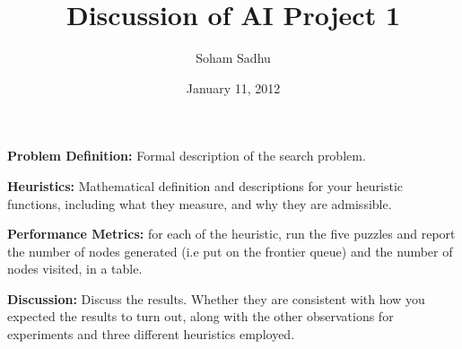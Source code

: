 \documentclass[12pt]{article}
\begin{document}
\title{ Discussion of AI Project 1 }
\author{ Soham Sadhu }
\date{ January 11, 2012 }
\maketitle

{\bf Problem Definition:} Formal description of the search problem.

{\bf Heuristics:} Mathematical definition and descriptions for your heuristic functions, including what they measure, and why they are admissible.

{\bf Performance Metrics:} for each of the heuristic, run the five puzzles and report the number of nodes generated (i.e put on the frontier queue) and the number of nodes visited, in a table.

{\bf Discussion:} Discuss the results. Whether they are consistent with how you expected the results to turn out, along with the other observations for experiments and three different heuristics employed.
\end{document}
